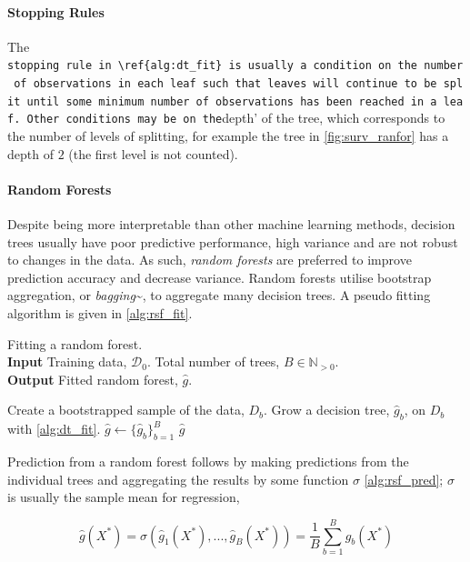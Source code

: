 \documentclass[
  letterpaper,
]{scrbook}
\let\oldparagraph\paragraph
\renewcommand{\paragraph}[1]{\oldparagraph{#1}\mbox{}}
\theoremstyle{plain}
\theoremstyle{definition}
\theoremstyle{remark}
\begin{document}
\paragraph{Stopping Rules}

The
\texttt{stopping\ rule\textquotesingle{}\ in\ \textbackslash{}ref\{alg:dt\_fit\}\ is\ usually\ a\ condition\ on\ the\ number\ of\ observations\ in\ each\ leaf\ such\ that\ leaves\ will\ continue\ to\ be\ split\ until\ some\ minimum\ number\ of\ observations\ has\ been\ reached\ in\ a\ leaf.\ Other\ conditions\ may\ be\ on\ the}depth'
of the tree, which corresponds to the number of levels of splitting, for
example the tree in \ref{fig:surv_ranfor} has a depth of \(2\) (the
first level is not counted).

\paragraph{Random Forests}

Despite being more interpretable than other machine learning methods,
decision trees usually have poor predictive performance, high variance
and are not robust to changes in the data. As such,
\emph{random forests} are preferred to improve prediction accuracy and
decrease variance. Random forests utilise bootstrap aggregation, or
\emph{bagging}\textasciitilde{}\cite{Breiman1996a}, to aggregate many
decision trees. A pseudo fitting algorithm is given in
\ref{alg:rsf_fit}.

\begin{algorithm}
\caption{Fitting a random forest. \\
\textbf{Input} Training data, $\mathcal{D}_0$. Total number of trees, $B \in \mathbb{N}_{> 0}$. \\
\textbf{Output} Fitted random forest, $\hat{g}$.}\label{alg:rsf_fit}
\begin{algorithmic}[1]
\State Create a bootstrapped sample of the data, $D_b$.
\State Grow a decision tree, $\hat{g}_b$, on $D_b$ with \ref{alg:dt_fit}.
\EndFor
\State $\hat{g}\gets \{\hat{g}_b\}^B_{b=1}$
\Return $\hat{g}$
\end{algorithmic}
\end{algorithm}

Prediction from a random forest follows by making predictions from the
individual trees and aggregating the results by some function \(\sigma\)
\ref{alg:rsf_pred}; \(\sigma\) is usually the sample mean for
regression,

\[
\hat{g}(X^*) = \sigma(\hat{g}_1(X^*),...,\hat{g}_B(X^*)) = \frac{1}{B} \sum^B_{b=1} \hat{g}_b(X^*)
\]
\end{document}
